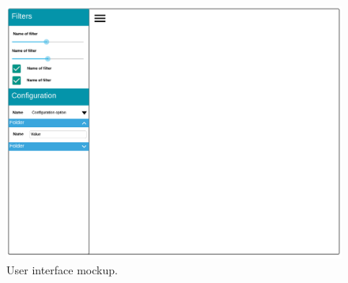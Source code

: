 \begin{figure}[H]
	\centering
    \includegraphics[width=\textwidth]{images/design/mockups/interface}
    \caption[User interface mockup]{User interface mockup.}
    \label{fig:user_interface_mockup}
\end{figure}
